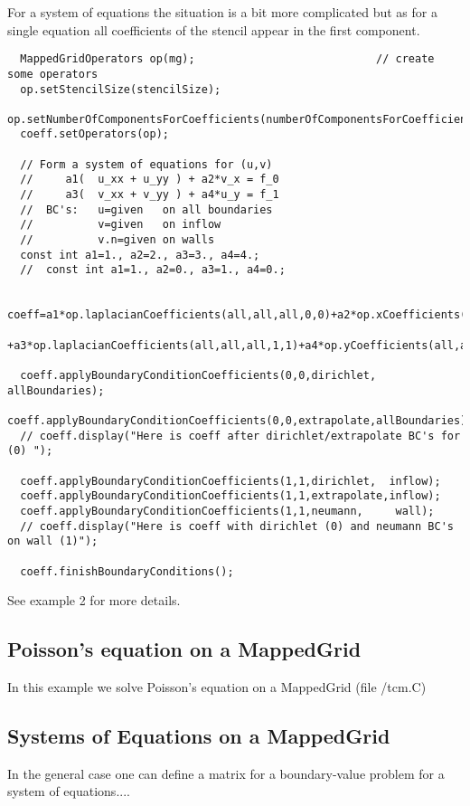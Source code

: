 For a system of equations the situation is a bit more complicated but as
for a single equation all coefficients of the stencil appear in the first
component.
{\footnotesize
\begin{verbatim}
  MappedGridOperators op(mg);                            // create some operators
  op.setStencilSize(stencilSize);
  op.setNumberOfComponentsForCoefficients(numberOfComponentsForCoefficients);
  coeff.setOperators(op);

  // Form a system of equations for (u,v)
  //     a1(  u_xx + u_yy ) + a2*v_x = f_0
  //     a3(  v_xx + v_yy ) + a4*u_y = f_1
  //  BC's:   u=given   on all boundaries
  //          v=given   on inflow
  //          v.n=given on walls
  const int a1=1., a2=2., a3=3., a4=4.;
  //  const int a1=1., a2=0., a3=1., a4=0.;

  coeff=a1*op.laplacianCoefficients(all,all,all,0,0)+a2*op.xCoefficients(all,all,all,0,1)
       +a3*op.laplacianCoefficients(all,all,all,1,1)+a4*op.yCoefficients(all,all,all,1,0);

  coeff.applyBoundaryConditionCoefficients(0,0,dirichlet,  allBoundaries);  
  coeff.applyBoundaryConditionCoefficients(0,0,extrapolate,allBoundaries);  
  // coeff.display("Here is coeff after dirichlet/extrapolate BC's for (0) ");

  coeff.applyBoundaryConditionCoefficients(1,1,dirichlet,  inflow);
  coeff.applyBoundaryConditionCoefficients(1,1,extrapolate,inflow);
  coeff.applyBoundaryConditionCoefficients(1,1,neumann,     wall);
  // coeff.display("Here is coeff with dirichlet (0) and neumann BC's on wall (1)");

  coeff.finishBoundaryConditions();
\end{verbatim}
}
See example 2 for more details.



\subsection{Poisson's equation on a MappedGrid}

In this example we solve Poisson's equation on a MappedGrid
(file {\ff \examples/tcm.C})
{\footnotesize
{}
}



\subsection{Systems of Equations on a MappedGrid}
  In the general case one can define a matrix for a boundary-value problem
for a system of equations....




